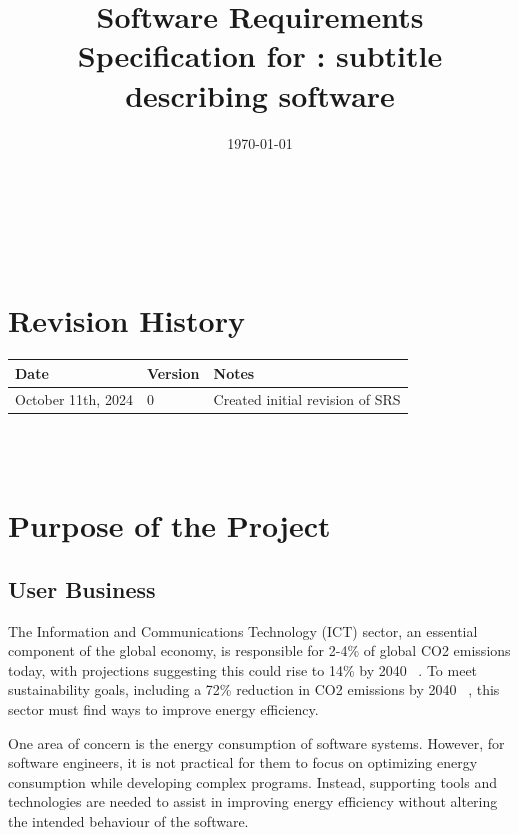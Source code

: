 \documentclass[12pt]{article}
\begin{document}

\title{Software Requirements Specification for \progname: subtitle describing software} 
\author{\authname}
\date{\today}
	
\maketitle
\thispagestyle{empty}

~\newpage

\tableofcontents

~\newpage

\section*{Revision History}

\begin{tabularx}{\textwidth}{p{3.5cm}p{2cm}X}
\toprule {\textbf{Date}} & {\textbf{Version}} & {\textbf{Notes}}\\
\midrule
October 11th, 2024 & 0 & Created initial revision of SRS\\
\bottomrule
\end{tabularx}

~\\

~\newpage
{}

\section{Purpose of the Project}
\subsection{User Business}
The Information and Communications Technology (ICT) sector, an essential component of the global economy, is responsible for 2-4\% of global CO2 emissions today, with projections suggesting this could rise to 14\% by 2040 ~\citep{BelkhirAndElmeligi2018}. To meet sustainability goals, including a 72\% reduction in CO2 emissions by 2040 ~\citep{FreitagAndBernersLee2021}, this sector must find ways to improve energy efficiency.

One area of concern is the energy consumption of software systems. However, for software engineers, it is not practical for them to focus on optimizing energy consumption while developing complex programs. Instead, supporting tools and technologies are needed to assist in improving energy efficiency without altering the intended behaviour of the software.
\end{document}
